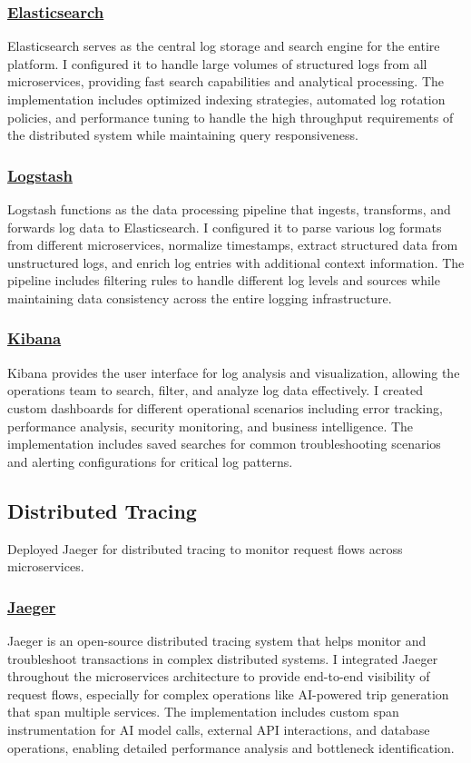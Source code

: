 \subsubsection*{\underline{Elasticsearch}}
Elasticsearch serves as the central log storage and search engine for the entire platform. I configured it to handle large volumes of structured logs from all microservices, providing fast search capabilities and analytical processing. The implementation includes optimized indexing strategies, automated log rotation policies, and performance tuning to handle the high throughput requirements of the distributed system while maintaining query responsiveness.

\subsubsection*{\underline{Logstash}}
Logstash functions as the data processing pipeline that ingests, transforms, and forwards log data to Elasticsearch. I configured it to parse various log formats from different microservices, normalize timestamps, extract structured data from unstructured logs, and enrich log entries with additional context information. The pipeline includes filtering rules to handle different log levels and sources while maintaining data consistency across the entire logging infrastructure.

\subsubsection*{\underline{Kibana}}
Kibana provides the user interface for log analysis and visualization, allowing the operations team to search, filter, and analyze log data effectively. I created custom dashboards for different operational scenarios including error tracking, performance analysis, security monitoring, and business intelligence. The implementation includes saved searches for common troubleshooting scenarios and alerting configurations for critical log patterns.

\subsection{Distributed Tracing}
Deployed Jaeger for distributed tracing to monitor request flows across microservices.

\subsubsection*{\underline{Jaeger}}
Jaeger is an open-source distributed tracing system that helps monitor and troubleshoot transactions in complex distributed systems. I integrated Jaeger throughout the microservices architecture to provide end-to-end visibility of request flows, especially for complex operations like AI-powered trip generation that span multiple services. The implementation includes custom span instrumentation for AI model calls, external API interactions, and database operations, enabling detailed performance analysis and bottleneck identification.


